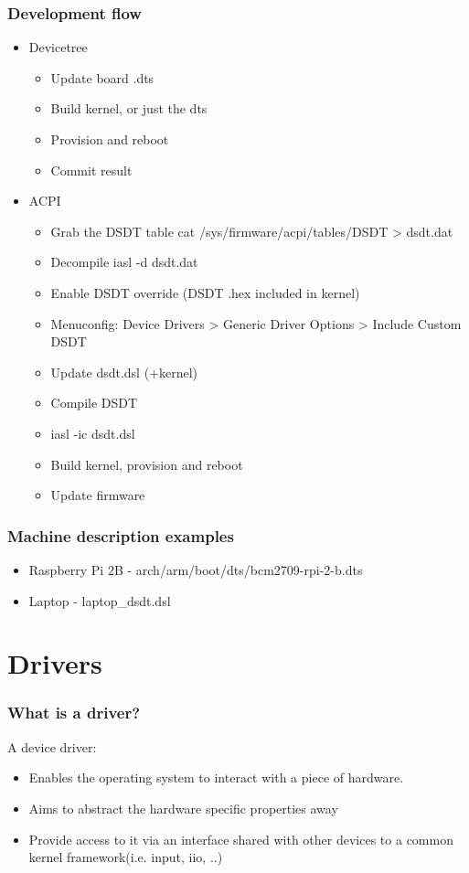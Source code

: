 \documentclass{beamer}
\begin{document}
\begin{frame}
\frametitle{Development flow}
\begin{itemize}
	\item Devicetree
	\begin{itemize}
		\item Update board .dts
		\item Build kernel, or just the dts
		\item Provision and reboot
		\item Commit result  
	\end{itemize}
	\item ACPI
	\begin{itemize}
		\item Grab the DSDT table cat /sys/firmware/acpi/tables/DSDT > dsdt.dat
		\item Decompile  iasl -d dsdt.dat 
		\item Enable  DSDT override (DSDT .hex included in kernel)
		\item Menuconfig: Device Drivers > Generic Driver Options > Include Custom DSDT
		\item Update dsdt.dsl (+kernel)
		\item Compile DSDT
		\item iasl -ic dsdt.dsl
		\item Build kernel, provision and reboot
		\item Update firmware 
	\end{itemize}
\end{itemize}
\end{frame}

\begin{frame}
\frametitle{Machine description examples}
\begin{itemize}
	\item Raspberry Pi 2B - arch/arm/boot/dts/bcm2709-rpi-2-b.dts
	\item Laptop - laptop\_dsdt.dsl
\end{itemize}
\end{frame}

\section{Drivers}

\begin{frame}
\frametitle{What is a driver?}
A device driver:
\begin{itemize}
	\item Enables the operating system to interact with a piece of hardware.
	\item Aims to abstract the hardware specific properties away
	\item Provide access to it via an interface shared with other devices to a common kernel framework(i.e. input, iio, ..) 
\end{itemize}
\end{frame}
\end{document}
